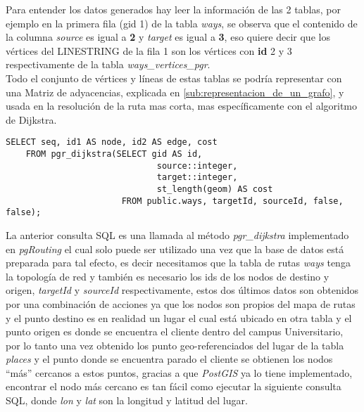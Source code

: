 Para entender los datos generados hay leer la información de las 2 tablas, por ejemplo en la primera  fila (gid 1) de la tabla \emph{ways}, se observa que el contenido de la columna \emph{source} es igual a \textbf{2} y \emph{target} es igual a \textbf{3}, eso quiere decir que los vértices del LINESTRING de la fila 1 son los vértices con \textbf{id} 2 y 3 respectivamente de la tabla \emph{ways\_vertices\_pgr}.\\


Todo el conjunto de vértices y líneas de estas tablas se podría representar con una Matriz de adyacencias, explicada en \ref{sub:representacion_de_un_grafo}, y usada en la resolución de la ruta mas corta, mas específicamente con el algoritmo de Dijkstra.\\

\begin{center}
  \begin{lstlisting}[label=pgr_dijkstra,caption=Algoritmo de Dijkstra implementado en \emph{pRouting}]
    SELECT seq, id1 AS node, id2 AS edge, cost
    FROM pgr_dijkstra(SELECT gid AS id,
                              source::integer,
                              target::integer,
                              st_length(geom) AS cost
                       FROM public.ways, targetId, sourceId, false, false);
  \end{lstlisting}
\end{center}


La anterior consulta SQL es una llamada al método \emph{pgr\_dijkstra} implementado en \emph{pgRouting} el cual solo puede ser utilizado una vez que la base de datos está preparada para tal efecto, es decir necesitamos que la tabla de rutas \emph{ways} tenga la topología de red y también es necesario los ids de los nodos de destino y origen, \emph{targetId} y \emph{sourceId} respectivamente, estos dos últimos datos son obtenidos por una combinación de acciones ya que los nodos son propios del mapa de rutas y el punto destino es en realidad un lugar el cual está ubicado en otra tabla y el punto origen es donde se encuentra el cliente dentro del campus Universitario, por lo tanto una vez obtenido los punto geo-referenciados del lugar de la tabla \emph{places} y el punto donde se encuentra parado el cliente se obtienen los nodos ``más'' cercanos a estos puntos, gracias a que \emph{PostGIS} ya lo tiene implementado, encontrar el nodo más cercano es tan fácil como ejecutar la siguiente consulta SQL, donde \emph{lon} y \emph{lat} son la longitud y latitud del lugar.

